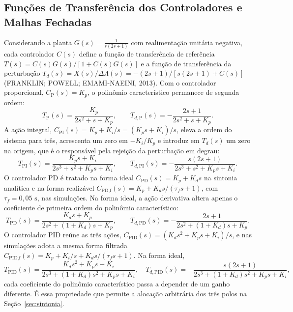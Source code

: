 \subsection{Funções de Transferência dos Controladores e Malhas Fechadas}\label{sec:fts_comp}
Considerando a planta $G(s) = \frac{1}{s(2s+1)}$ com realimentação unitária negativa, cada controlador $C(s)$ define a função de transferência de referência $T(s) = C(s)G(s)/[1+C(s)G(s)]$ e a função de transferência da perturbação $T_d(s) = X(s)/\Delta\Lambda(s) = -(2s+1)/[s(2s+1)+C(s)]$ (FRANKLIN; POWELL; EMAMI-NAEINI, 2013). Com o controlador proporcional, $C_{\text{P}}(s) = K_p$, o polinômio característico permanece de segunda ordem:
\begin{equation}
    T_{\text{P}}(s) = \frac{K_p}{2s^2 + s + K_p}, \qquad T_{d,\text{P}}(s) = -\frac{2s+1}{2s^2 + s + K_p}.
\end{equation}
A ação integral, $C_{\text{PI}}(s) = K_p + K_i/s = (K_p s + K_i)/s$, eleva a ordem do sistema para três, acrescenta um zero em $-K_i/K_p$ e introduz em $T_d(s)$ um zero na origem, que é o responsável pela rejeição da perturbação em degrau:
\begin{equation}
    T_{\text{PI}}(s) = \frac{K_p s + K_i}{2s^3 + s^2 + K_p s + K_i}, \qquad T_{d,\text{PI}}(s) = -\frac{s(2s+1)}{2s^3 + s^2 + K_p s + K_i}.
\end{equation}
O controlador PD é tratado na forma ideal $C_{\text{PD}}(s) = K_p + K_d s$ na sintonia analítica e na forma realizável $C_{\text{PD,f}}(s) = K_p + K_d s/(\tau_f s+1)$, com $\tau_f = 0{,}05\text{ s}$, nas simulações. Na forma ideal, a ação derivativa altera apenas o coeficiente de primeira ordem do polinômio característico:
\begin{equation}
    T_{\text{PD}}(s) = \frac{K_d s + K_p}{2s^2 + (1 + K_d)s + K_p}, \qquad T_{d,\text{PD}}(s) = -\frac{2s+1}{2s^2 + (1 + K_d)s + K_p}.
\end{equation}
O controlador PID reúne as três ações, $C_{\text{PID}}(s) = (K_d s^2 + K_p s + K_i)/s$, e nas simulações adota a mesma forma filtrada $C_{\text{PID,f}}(s) = K_p + K_i/s + K_d s/(\tau_f s+1)$. Na forma ideal,
\begin{equation}
    T_{\text{PID}}(s) = \frac{K_d s^2 + K_p s + K_i}{2s^3 + (1 + K_d)s^2 + K_p s + K_i}, \quad T_{d,\text{PID}}(s) = -\frac{s(2s+1)}{2s^3 + (1 + K_d)s^2 + K_p s + K_i},
\end{equation}
cada coeficiente do polinômio característico passa a depender de um ganho diferente. É essa propriedade que permite a alocação arbitrária dos três polos na Seção~\ref{sec:sintonia}.

